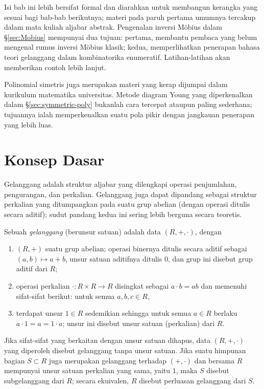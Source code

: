 \begin{wenxintishi}
	Isi bab ini lebih bersifat formal dan diarahkan untuk membangun kerangka yang sesuai bagi bab-bab berikutnya; materi pada paruh pertama umumnya tercakup dalam mata kuliah aljabar abstrak. Pengenalan inversi Möbius dalam \S\ref{sec:Mobius} mempunyai dua tujuan: pertama, membantu pembaca yang belum mengenal rumus inversi Möbius klasik; kedua, memperlihatkan penerapan bahasa teori gelanggang dalam kombinatorika enumeratif. Latihan-latihan akan memberikan contoh lebih lanjut.

	Polinomial simetris juga merupakan materi yang kerap dijumpai dalam kurikulum matematika universitas. Metode diagram Young yang diperkenalkan dalam \S\ref{sec:symmetric-poly} bukanlah cara tercepat ataupun paling sederhana; tujuannya ialah memperkenalkan suatu pola pikir dengan jangkauan penerapan yang lebih luas.
\end{wenxintishi}

\section{Konsep Dasar}\label{sec:ring-basics}
Gelanggang adalah struktur aljabar yang dilengkapi operasi penjumlahan, pengurangan, dan perkalian. Gelanggang juga dapat dipandang sebagai struktur perkalian yang ditumpangkan pada suatu grup abelian (dengan operasi ditulis secara aditif); sudut pandang kedua ini sering lebih berguna secara teoretis.

\begin{definition}
	Sebuah \emph{gelanggang} (berunsur satuan) adalah data $(R, +, \cdot)$, dengan
	\begin{enumerate}
		\item $(R, +)$ suatu grup abelian; operasi binernya ditulis secara aditif sebagai $(a,b) \mapsto a+b$, unsur satuan aditifnya ditulis $0$, dan grup ini disebut grup aditif dari $R$;
		\item operasi perkalian $\cdot: R \times R \to R$ disingkat sebagai $a \cdot b = ab$ dan memenuhi sifat-sifat berikut: untuk semua $a, b, c \in R$,
		\item terdapat unsur $1 \in R$ sedemikian sehingga untuk semua $a \in R$ berlaku $a \cdot 1 = a = 1 \cdot a$; unsur ini disebut unsur satuan (perkalian) dari $R$.
	\end{enumerate}
	Jika sifat-sifat yang berkaitan dengan unsur satuan dihapus, data $(R, +, \cdot)$ yang diperoleh disebut gelanggang tanpa unsur satuan. Jika suatu himpunan bagian $S \subset R$ juga merupakan gelanggang terhadap $(+, \cdot)$ dan bersama $R$ mempunyai unsur satuan perkalian yang sama, yaitu $1$, maka $S$ disebut subgelanggang dari $R$; secara ekuivalen, $R$ disebut perluasan gelanggang dari $S$.
\end{definition}

